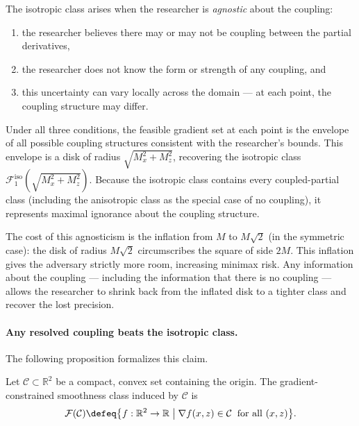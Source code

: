 The isotropic class arises when the researcher is \emph{agnostic} about the coupling:
\begin{enumerate}
	\item the researcher believes there may or may not be coupling between the partial derivatives,
	\item the researcher does not know the form or strength of any coupling, and
	\item this uncertainty can vary locally across the domain --- at each point, the coupling structure may differ.
\end{enumerate}
Under all three conditions, the feasible gradient set at each point is the envelope of all possible coupling structures consistent with the researcher's bounds.
This envelope is a disk of radius $\sqrt{M_x^2 + M_z^2}$, recovering the isotropic class $\mathcal{F}_1^{\mathrm{iso}}(\sqrt{M_x^2 + M_z^2})$.
Because the isotropic class contains every coupled-partial class (including the anisotropic class as the special case of no coupling), it represents maximal ignorance about the coupling structure.

The cost of this agnosticism is the inflation from $M$ to $M\sqrt{2}$ (in the symmetric case): the disk of radius $M\sqrt{2}$ circumscribes the square of side $2M$.
This inflation gives the adversary strictly more room, increasing minimax risk.
Any information about the coupling --- including the information that there is no coupling --- allows the researcher to shrink back from the inflated disk to a tighter class and recover the lost precision.

\paragraph{Any resolved coupling beats the isotropic class.}
The following proposition formalizes this claim.

\begin{definition}\label{def:gradient_class}
	Let $\mathcal{C} \subset \mathbb{R}^2$ be a compact, convex set containing the origin.
	The gradient-constrained smoothness class induced by $\mathcal{C}$ is
	\begin{equation*}
		\mathcal{F}(\mathcal{C}) \defeq \bigl\{ f : \mathbb{R}^2 \to \mathbb{R} \;\big|\; \nabla f(x,z) \in \mathcal{C} \;\; \text{for all } (x,z) \bigr\}.
	\end{equation*}
\end{definition}

